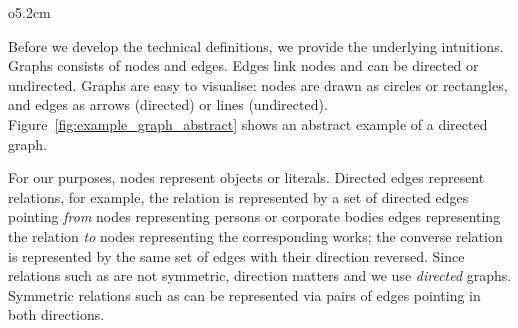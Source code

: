 \begin{wrapfigure}[6]{o}{5.2cm}
  \centering
  \vspace*{-.7\baselineskip}
  \caption{A directed graph}
  \label{fig:example_graph_abstract}
\end{wrapfigure}

Before we develop the technical definitions,
we provide the underlying intuitions.
Graphs consists of nodes and edges. Edges link nodes and can be directed
or undirected. Graphs are easy to visualise: nodes are drawn as circles
or rectangles, and edges as arrows (directed) or lines (undirected).
Figure~\ref{fig:example_graph_abstract} shows an abstract example of a directed graph.

For our purposes,
nodes represent objects or literals. 
Directed edges represent relations, 
for example, 
the relation  is represented by a set of directed edges
pointing \emph{from} nodes representing persons or corporate bodies
edges representing the relation
\emph{to} nodes representing the corresponding works;
the converse relation  is represented by the same set of edges 
with their direction reversed.
Since relations such as  are not symmetric,
direction matters and we use \emph{directed} graphs. 
Symmetric relations such as 
can be represented via pairs of edges pointing in both directions.

